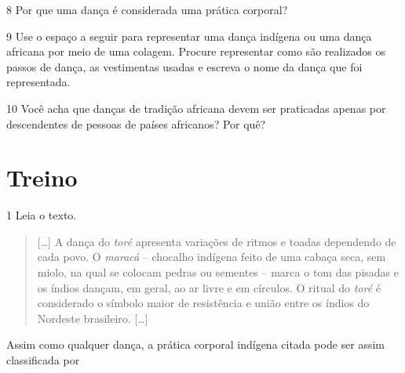\num{8} Por que uma dança é considerada uma prática corporal?


\num{9} Use o espaço a seguir para representar uma dança indígena ou uma dança
  africana por meio de uma colagem. Procure representar como são realizados
  os passos de dança, as vestimentas usadas e escreva o nome da dança
  que foi representada.

\begin{mdframed}[linewidth=2pt,linecolor=salmao]
\vspace{5cm}
\end{mdframed}

\num{10} Você acha que danças de tradição africana devem ser praticadas apenas por descendentes de pessoas de países africanos? Por quê?


\section*{Treino}

\num{1} Leia o texto.
\begin{quote}
  {[}\ldots{}{]} A dança do \emph{toré} apresenta variações de ritmos e toadas
  dependendo de cada povo. O \emph{maracá} – chocalho indígena feito de
  uma cabaça seca, sem miolo, na qual se colocam pedras ou sementes –
  marca o tom das pisadas e os índios dançam, em geral, ao ar livre e em
  círculos. O ritual do \emph{toré} é considerado o símbolo maior de
  resistência e união entre os índios
  do Nordeste brasileiro. {[}\ldots{}{]}

\end{quote}

\noindent{}Assim como qualquer dança, a prática corporal indígena citada pode ser assim classificada por

